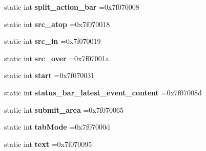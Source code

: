 \begin{DoxyCompactItemize}
static int {\bfseries split\+\_\+action\+\_\+bar} =0x7f070008
\item 
\mbox{\label{classandroid_1_1support_1_1v7_1_1cardview_1_1R_1_1id_a3cdae1c71012cdf1f824f0f38b463ff1}} 
static int {\bfseries src\+\_\+atop} =0x7f070018
\item 
\mbox{\label{classandroid_1_1support_1_1v7_1_1cardview_1_1R_1_1id_a66f9207157780d77027704d5e6789554}} 
static int {\bfseries src\+\_\+in} =0x7f070019
\item 
\mbox{\label{classandroid_1_1support_1_1v7_1_1cardview_1_1R_1_1id_ae2e6cad172ce6915963f70e716a7bf5a}} 
static int {\bfseries src\+\_\+over} =0x7f07001a
\item 
\mbox{\label{classandroid_1_1support_1_1v7_1_1cardview_1_1R_1_1id_aaf30f40aa46be431746d7fbbd7455813}} 
static int {\bfseries start} =0x7f070031
\item 
\mbox{\label{classandroid_1_1support_1_1v7_1_1cardview_1_1R_1_1id_acb042a6983b786c44220904c8874285a}} 
static int {\bfseries status\+\_\+bar\+\_\+latest\+\_\+event\+\_\+content} =0x7f07008d
\item 
\mbox{\label{classandroid_1_1support_1_1v7_1_1cardview_1_1R_1_1id_a1f585aef9377899fc6fb7a439caf51b3}} 
static int {\bfseries submit\+\_\+area} =0x7f070065
\item 
\mbox{\label{classandroid_1_1support_1_1v7_1_1cardview_1_1R_1_1id_a38aeb8c03ce0ed6cf2923bd63236d11c}} 
static int {\bfseries tab\+Mode} =0x7f07000d
\item 
\mbox{\label{classandroid_1_1support_1_1v7_1_1cardview_1_1R_1_1id_a02fe80dff35a628d8c52433baca64022}} 
static int {\bfseries text} =0x7f070095
\item 
\mbox{\label{classandroid_1_1support_1_1v7_1_1cardview_1_1R_1_1id_ac2b3fa5b53340ad8868fd77a47622d01}} 

\end{DoxyCompactItemize}
